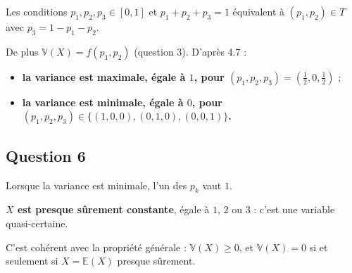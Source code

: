 \documentclass[11pt,a4paper]{article}
\providecommand{\tightlist}{\setlength{\itemsep}{0pt}\setlength{\parskip}{0pt}}
\begin{document}
Les conditions \(p_1,p_2,p_3\in[0,1]\) et \(p_1+p_2+p_3=1\) équivalent à \((p_1,p_2)\in T\) avec \(p_3=1-p_1-p_2\).

De plus \(\mathbb V(X)=f(p_1,p_2)\) (question 3). D'après 4.7 :

\begin{itemize}
\tightlist
\item
  \textbf{la variance est maximale, égale à \(1\), pour \((p_1,p_2,p_3)=(\frac12,0,\frac12)\)} ;
\item
  \textbf{la variance est minimale, égale à \(0\), pour \((p_1,p_2,p_3)\in\{(1,0,0),(0,1,0),(0,0,1)\}\).}
\end{itemize}

\hypertarget{question-6}{%
\subsection{Question 6}\label{question-6}}

Lorsque la variance est minimale, l'un des \(p_k\) vaut \(1\).

\textbf{\(X\) est presque sûrement constante}, égale à \(1\), \(2\) ou \(3\) : c'est une variable quasi-certaine.

C'est cohérent avec la propriété générale : \(\mathbb V(X)\ge0\), et \(\mathbb V(X)=0\) si et seulement si \(X=\mathbb E(X)\) presque sûrement.
\end{document}
